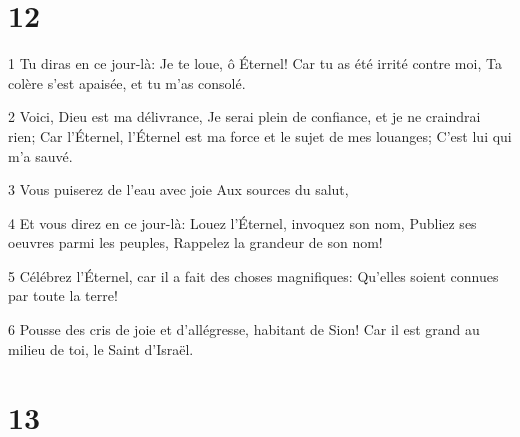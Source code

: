 \chapter{12}

\par 1 Tu diras en ce jour-là: Je te loue, ô Éternel! Car tu as été irrité contre moi, Ta colère s'est apaisée, et tu m'as consolé.
\par 2 Voici, Dieu est ma délivrance, Je serai plein de confiance, et je ne craindrai rien; Car l'Éternel, l'Éternel est ma force et le sujet de mes louanges; C'est lui qui m'a sauvé.
\par 3 Vous puiserez de l'eau avec joie Aux sources du salut,
\par 4 Et vous direz en ce jour-là: Louez l'Éternel, invoquez son nom, Publiez ses oeuvres parmi les peuples, Rappelez la grandeur de son nom!
\par 5 Célébrez l'Éternel, car il a fait des choses magnifiques: Qu'elles soient connues par toute la terre!
\par 6 Pousse des cris de joie et d'allégresse, habitant de Sion! Car il est grand au milieu de toi, le Saint d'Israël.

\chapter{13}

